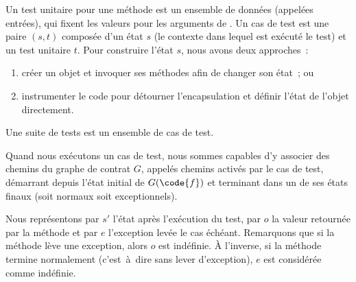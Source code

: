 \begin{definition}

Un {\strong test unitaire} pour une méthode  est un ensemble de données
(appelées entrées), qui fixent les valeurs pour les arguments de . Un
{\strong cas de test} est une paire $(s, t)$ composée d'un état $s$ (le contexte
dans lequel est exécuté le test) et un test unitaire $t$. Pour construire l'état
$s$, nous avons deux approches~:
%
\begin{enumerate}

\item créer un objet et invoquer ses méthodes afin de changer son état~; ou

\item instrumenter le code pour détourner l'encapsulation et définir l'état de
l'objet directement.

\end{enumerate}
%
Une {\strong suite de tests} est un ensemble de cas de test.

\end{definition}

Quand nous exécutons un cas de test, nous sommes capables d'y associer des
chemins du graphe de contrat $G$, appelés chemins {\strong activés par} le cas
de test, démarrant depuis l'état initial de $G(\code{f})$ et terminant dans un
de ses états finaux (soit normaux soit exceptionnels).

Nous représentons par $s'$ l'état après l'exécution du test, par $o$ la valeur
retournée par la méthode  et par $e$ l'exception levée le cas échéant.
Remarquons que si la méthode lève une exception, alors $o$ est indéfinie. À
l'inverse, si la méthode termine normalement (c'est~à~dire sans lever
d'exception), $e$ est considérée comme indéfinie.


